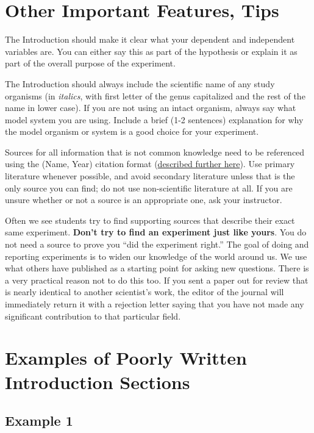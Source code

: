 \documentclass[
]{book}
\begin{document}
\hypertarget{other-important-features-tips}{%
\section{Other Important Features, Tips}\label{other-important-features-tips}}

The Introduction should make it clear what your dependent and independent variables are. You can either say this as part of the hypothesis or explain it as part of the overall purpose of the experiment.

The Introduction should always include the scientific name of any study organisms (in \emph{italics}, with first letter of the genus capitalized and the rest of the name in lower case). If you are not using an intact organism, always say what model system you are using. Include a brief (1-2 sentences) explanation for why the model organism or system is a good choice for your experiment.

Sources for all information that is not common knowledge need to be referenced using the (Name, Year) citation format (\protect\hyperlink{citformats510}{described further here}). Use primary literature whenever possible, and avoid secondary literature unless that is the only source you can find; do not use non-scientific literature at all. If you are unsure whether or not a source is an appropriate one, ask your instructor.

Often we see students try to find supporting sources that describe their exact same experiment. \textbf{Don't try to find an experiment just like yours}. You do not need a source to prove you ``did the experiment right.'' The goal of doing and reporting experiments is to widen our knowledge of the world around us. We use what others have published as a starting point for asking new questions. There is a very practical reason not to do this too. If you sent a paper out for review that is nearly identical to another scientist's work, the editor of the journal will immediately return it with a rejection letter saying that you have not made any significant contribution to that particular field.

\hypertarget{examples-of-poorly-written-introduction-sections}{%
\section{Examples of Poorly Written Introduction Sections}\label{examples-of-poorly-written-introduction-sections}}

\hypertarget{example-1-2}{%
\subsection{Example 1}\label{example-1-2}}
\end{document}
